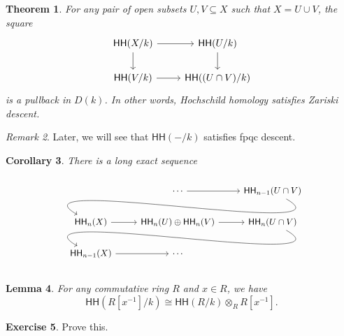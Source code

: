 \documentclass[10pt]{amsart}
\newtheorem{thm}{Theorem}[section]
\newtheorem{cor}[thm]{Corollary}
\newtheorem{lem}[thm]{Lemma}
\theoremstyle{definition}
\newtheorem{exer}[thm]{Exercise}
\theoremstyle{remark}
\newtheorem{rmk}[thm]{Remark}
\theoremstyle{plain}
\theoremstyle{definition}
\theoremstyle{remark}
\newcommand{\ms}[1]{\mathsf{#1}}
\newcommand{\1}{\mathbf{1}}
\newcommand{\2}{\mathbf{2}}
\newcommand{\3}{\mathbf{3}}
\newcommand{\HH}{\ms{HH}}
\begin{document}
\begin{thm}\label{thm:zariskidescent}
    For any pair of open subsets $U, V \subseteq X$ such that $X = U \cup V$, the square
    \begin{equation*}
    \begin{tikzcd}
        \HH(X/k) \ar{r} \ar{d} & \HH(U/k) \ar{d} \\
        \HH(V/k) \ar{r} & \HH((U \cap V)/k)
    \end{tikzcd}
    \end{equation*}
    is a pullback in $D(k)$. In other words, Hochschild homology satisfies Zariski descent.
\end{thm}

\begin{rmk}
    Later, we will see that $\HH(-/k)$ satisfies fpqc descent.
\end{rmk}

\begin{cor}
    There is a long exact sequence
    \begin{equation*}
        \begin{tikzcd}
            & \cdots \ar{r} & \HH_{n-1}(U \cap V) \arrow[out=-30, in=150]{dll} \\
            \HH_{n}(X) \ar{r} & \HH_n(U) \oplus \HH_n(V) \ar{r} & \HH_n(U \cap V) \arrow[out=-30,in=150]{dll} \\
            \HH_{n-1}(X) \ar{r} & \cdots
        \end{tikzcd}
    \end{equation*}
\end{cor}

\begin{lem}
    For any commutative ring $R$ and $x \in R$, we have
    \[ \HH(R[x^{-1}]/k) \cong \HH(R/k) \otimes_R R[x^{-1}]. \]
\end{lem}

\begin{exer}
    Prove this.
\end{exer}
\end{document}
